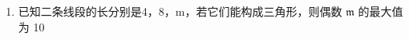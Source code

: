 \begin{enumerate}
\def\labelenumi{\arabic{enumi}.}
\setcounter{enumi}{1}
\tightlist
\item
  已知二条线段的长分别是4，8，m，若它们能构成三角形，则偶数
  \(\scriptstyle { \mathfrak { m } }\) 的最大值为 10
\end{enumerate}

